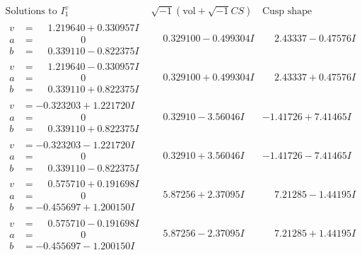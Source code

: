 \documentclass[1p]{elsarticle_modified}
\theoremstyle{definition}
\newcommand{\I}{\sqrt{-1}}
\begin{document}
$$\begin{array}{c|c|c}  
\text{Solutions to }I^v_{1}& \I (\text{vol} + \sqrt{-1}CS) & \text{Cusp shape}\\
 \hline 
\begin{aligned}
v &= \phantom{-}1.219640 + 0.330957 I \\
a &= \phantom{-0.000000 } 0 \\
b &= \phantom{-}0.339110 - 0.822375 I\end{aligned}
 & \phantom{-}0.329100 - 0.499304 I & \phantom{-}2.43337 - 0.47576 I \\ \hline\begin{aligned}
v &= \phantom{-}1.219640 - 0.330957 I \\
a &= \phantom{-0.000000 } 0 \\
b &= \phantom{-}0.339110 + 0.822375 I\end{aligned}
 & \phantom{-}0.329100 + 0.499304 I & \phantom{-}2.43337 + 0.47576 I \\ \hline\begin{aligned}
v &= -0.323203 + 1.221720 I \\
a &= \phantom{-0.000000 } 0 \\
b &= \phantom{-}0.339110 + 0.822375 I\end{aligned}
 & \phantom{-}0.32910 - 3.56046 I & -1.41726 + 7.41465 I \\ \hline\begin{aligned}
v &= -0.323203 - 1.221720 I \\
a &= \phantom{-0.000000 } 0 \\
b &= \phantom{-}0.339110 - 0.822375 I\end{aligned}
 & \phantom{-}0.32910 + 3.56046 I & -1.41726 - 7.41465 I \\ \hline\begin{aligned}
v &= \phantom{-}0.575710 + 0.191698 I \\
a &= \phantom{-0.000000 } 0 \\
b &= -0.455697 + 1.200150 I\end{aligned}
 & \phantom{-}5.87256 + 2.37095 I & \phantom{-}7.21285 - 1.44195 I \\ \hline\begin{aligned}
v &= \phantom{-}0.575710 - 0.191698 I \\
a &= \phantom{-0.000000 } 0 \\
b &= -0.455697 - 1.200150 I\end{aligned}
 & \phantom{-}5.87256 - 2.37095 I & \phantom{-}7.21285 + 1.44195 I \\ \hline\begin{aligned}

\end{aligned}
\end{array}$$
\end{document}
